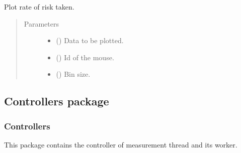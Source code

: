 \documentclass[letterpaper,10pt,english]{sphinxmanual}
\begin{document}
\begin{fulllineitems}
\label{\detokenize{NoSeMazeControl/Analysis:Analysis.Performance.show_total_risk}}
\pysigstartsignatures
{}
\pysigstopsignatures
\sphinxAtStartPar
Plot rate of risk taken.
\begin{quote}\begin{description}
\item[{Parameters}] \leavevmode\begin{itemize}
\item {} 
\sphinxAtStartPar
{} () \textendash{} Data to be plotted.

\item {} 
\sphinxAtStartPar
{} () \textendash{} Id of the mouse.

\item {} 
\sphinxAtStartPar
{} () \textendash{} Bin size.

\end{itemize}

\end{description}\end{quote}

\end{fulllineitems}


\sphinxstepscope


\subsection{Controllers package}
\label{\detokenize{NoSeMazeControl/Controllers:controllers-package}}\label{\detokenize{NoSeMazeControl/Controllers::doc}}

\subsubsection{Controllers}
\label{\detokenize{NoSeMazeControl/Controllers:controllers}}
\sphinxAtStartPar
This package contains the controller of measurement thread and its worker.
\end{document}
